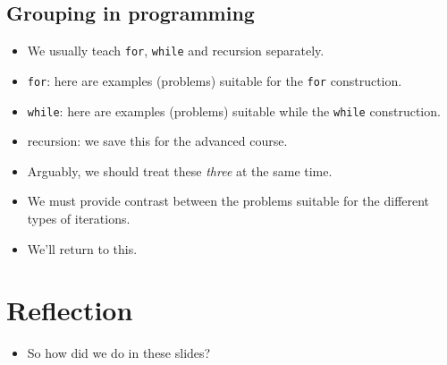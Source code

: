 \subsection{Grouping in programming}

\begin{frame}\label<2>{vtgroupprog}
  \begin{example}[Iterations]
    \begin{itemize}
      \item We usually teach \texttt{for}, 
        \texttt{while} and recursion separately.
      \item \texttt{for}: here are examples (problems) suitable for 
        the \texttt{for} construction.
      \item \texttt{while}: here are examples (problems) suitable 
        while the \texttt{while} construction.
      \item recursion: we save this for the advanced course.
    \end{itemize}
  \end{example}

  \pause

  \begin{remark}
    \begin{itemize}
      \item Arguably, we should treat these \emph{three} at the same time.
      \item We must provide contrast between the problems suitable for the 
        different types of iterations.
      \item We'll return to this.
    \end{itemize}
  \end{remark}
\end{frame}

\section{Reflection}

\begin{frame}
  \begin{question}
    \begin{itemize}
      \item So how did we do in these slides?
    \end{itemize}
  \end{question}
\end{frame}

